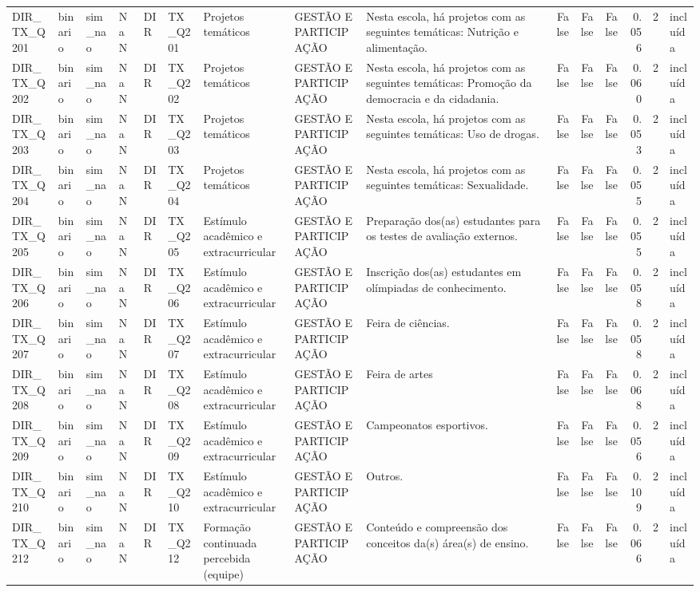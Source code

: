 \begin{tabular}{lllllllllrrrrrl}
DIR\_TX\_Q201 & binario & sim\_nao & NaN & DIR & TX\_Q201 & Projetos temáticos & GESTÃO E PARTICIPAÇÃO & Nesta escola, há projetos com as seguintes temáticas: Nutrição e alimentação. & False & False & False & 0.056 & 2 & incluída \\
DIR\_TX\_Q202 & binario & sim\_nao & NaN & DIR & TX\_Q202 & Projetos temáticos & GESTÃO E PARTICIPAÇÃO & Nesta escola, há projetos com as seguintes temáticas: Promoção da democracia e da cidadania. & False & False & False & 0.060 & 2 & incluída \\
DIR\_TX\_Q203 & binario & sim\_nao & NaN & DIR & TX\_Q203 & Projetos temáticos & GESTÃO E PARTICIPAÇÃO & Nesta escola, há projetos com as seguintes temáticas: Uso de drogas. & False & False & False & 0.053 & 2 & incluída \\
DIR\_TX\_Q204 & binario & sim\_nao & NaN & DIR & TX\_Q204 & Projetos temáticos & GESTÃO E PARTICIPAÇÃO & Nesta escola, há projetos com as seguintes temáticas: Sexualidade. & False & False & False & 0.055 & 2 & incluída \\
DIR\_TX\_Q205 & binario & sim\_nao & NaN & DIR & TX\_Q205 & Estímulo acadêmico e extracurricular & GESTÃO E PARTICIPAÇÃO & Preparação dos(as) estudantes para os testes de avaliação externos. & False & False & False & 0.055 & 2 & incluída \\
DIR\_TX\_Q206 & binario & sim\_nao & NaN & DIR & TX\_Q206 & Estímulo acadêmico e extracurricular & GESTÃO E PARTICIPAÇÃO & Inscrição dos(as) estudantes em olímpiadas de conhecimento. & False & False & False & 0.058 & 2 & incluída \\
DIR\_TX\_Q207 & binario & sim\_nao & NaN & DIR & TX\_Q207 & Estímulo acadêmico e extracurricular & GESTÃO E PARTICIPAÇÃO & Feira de ciências. & False & False & False & 0.058 & 2 & incluída \\
DIR\_TX\_Q208 & binario & sim\_nao & NaN & DIR & TX\_Q208 & Estímulo acadêmico e extracurricular & GESTÃO E PARTICIPAÇÃO & Feira de artes & False & False & False & 0.068 & 2 & incluída \\
DIR\_TX\_Q209 & binario & sim\_nao & NaN & DIR & TX\_Q209 & Estímulo acadêmico e extracurricular & GESTÃO E PARTICIPAÇÃO & Campeonatos esportivos. & False & False & False & 0.056 & 2 & incluída \\
DIR\_TX\_Q210 & binario & sim\_nao & NaN & DIR & TX\_Q210 & Estímulo acadêmico e extracurricular & GESTÃO E PARTICIPAÇÃO & Outros. & False & False & False & 0.109 & 2 & incluída \\
DIR\_TX\_Q212 & binario & sim\_nao & NaN & DIR & TX\_Q212 & Formação continuada percebida (equipe) & GESTÃO E PARTICIPAÇÃO & Conteúdo e compreensão dos conceitos da(s) área(s) de ensino. & False & False & False & 0.066 & 2 & incluída \\

\end{tabular}
